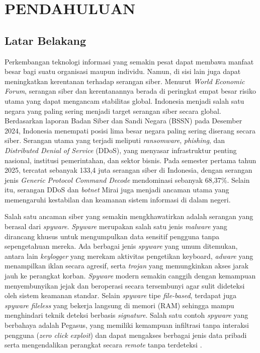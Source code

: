 \chapter{PENDAHULUAN}
\label{chap:pendahuluan}
\section{Latar Belakang}
Perkembangan teknologi informasi yang semakin pesat dapat membawa manfaat besar bagi suatu organisasi maupun individu. Namun, di sisi lain juga dapat meningkatkan kerentanan terhadap serangan siber. Menurut \textit{World Economic Forum}, serangan siber dan kerentanannya berada di peringkat empat besar risiko utama yang dapat mengancam stabilitas global. Indonesia menjadi salah satu negara yang paling sering menjadi target serangan siber secara global. Berdasarkan laporan Badan Siber dan Sandi Negara (BSSN) pada Desember 2024, Indonesia menempati posisi lima besar negara paling sering diserang secara siber. Serangan utama yang terjadi meliputi \textit{ransomware}, \textit{phishing}, dan \textit{Distributed Denial of Service} (DDoS), yang menyasar infrastruktur penting nasional, institusi pemerintahan, dan sektor bisnis. Pada semester pertama tahun 2025, tercatat sebanyak 133{,}4 juta serangan siber di Indonesia, dengan serangan jenis \textit{Generic Protocol Command Decode} mendominasi sebanyak 68{,}37\%. Selain itu, serangan DDoS dan \textit{botnet} Mirai juga menjadi ancaman utama yang memengaruhi kestabilan dan keamanan sistem informasi di dalam negeri.

Salah satu ancaman siber yang semakin mengkhawatirkan adalah serangan yang berasal dari \textit{spyware}. \textit{Spyware} merupakan salah satu jenis \textit{malware} yang dirancang khusus untuk mengumpulkan data sensitif pengguna tanpa sepengetahuan mereka. Ada berbagai jenis \textit{spyware} yang umum ditemukan, antara lain \textit{keylogger} yang merekam aktivitas pengetikan keyboard, \textit{adware} yang menampilkan iklan secara agresif, serta \textit{trojan} yang memungkinkan akses jarak jauh ke perangkat korban. \textit{Spyware} modern semakin canggih dengan kemampuan menyembunyikan jejak dan beroperasi secara tersembunyi agar sulit dideteksi oleh sistem keamanan standar. Selain \textit{spyware} tipe \textit{file-based}, terdapat juga \textit{spyware fileless} yang bekerja langsung di memori (RAM) sehingga mampu menghindari teknik deteksi berbasis \textit{signature}. Salah satu contoh \textit{spyware} yang berbahaya adalah Pegasus, yang memiliki kemampuan infiltrasi tanpa interaksi pengguna (\textit{zero click exploit}) dan dapat mengakses berbagai jenis data pribadi serta mengendalikan perangkat secara \textit{remote} tanpa terdeteksi \autocite{reddy2024review}.

